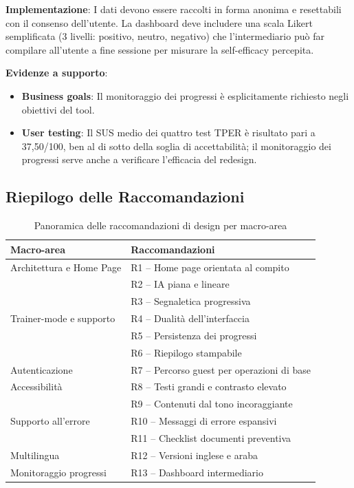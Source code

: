 ﻿\documentclass[11pt,a4paper]{article}
\begin{document}
\textbf{Implementazione}: I dati devono essere raccolti in forma anonima
e resettabili con il consenso dell'utente. La dashboard deve includere una
scala Likert semplificata (3 livelli: positivo, neutro, negativo) che l'intermediario pu\`o far
compilare all'utente a fine sessione per misurare la self-efficacy percepita.

\textbf{Evidenze a supporto}:
\begin{itemize}
    \item \textbf{Business goals}: Il monitoraggio dei progressi \`e esplicitamente
    richiesto negli obiettivi del tool.
    \item \textbf{User testing}: Il SUS medio dei quattro test TPER \`e risultato
    pari a 37,50/100, ben al di sotto della soglia di accettabilit\`a; il
    monitoraggio dei progressi serve anche a verificare l'efficacia del redesign.
\end{itemize}


\newpage
\subsection{Riepilogo delle Raccomandazioni}

\begin{table}[htbp]
\centering
\caption{Panoramica delle raccomandazioni di design per macro-area}
\label{tab:recommendations-summary}
\begin{tabular}{|p{2.8cm}|p{10cm}|}
\hline
\textbf{Macro-area} & \textbf{Raccomandazioni} \\
\hline
Architettura e Home Page & R1 -- Home page orientata al compito \\
& R2 -- IA piana e lineare \\
& R3 -- Segnaletica progressiva \\
\hline
Trainer-mode e supporto & R4 -- Dualit\`a dell'interfaccia \\
& R5 -- Persistenza dei progressi \\
& R6 -- Riepilogo stampabile \\
\hline
Autenticazione & R7 -- Percorso guest per operazioni di base \\
\hline
Accessibilit\`a & R8 -- Testi grandi e contrasto elevato \\
& R9 -- Contenuti dal tono incoraggiante \\
\hline
Supporto all'errore & R10 -- Messaggi di errore espansivi \\
& R11 -- Checklist documenti preventiva \\
\hline
Multilingua & R12 -- Versioni inglese e araba \\
\hline
Monitoraggio progressi & R13 -- Dashboard intermediario \\
\hline
\end{tabular}
\end{table}
\end{document}
